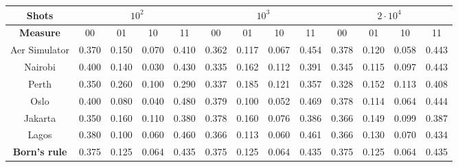\begin{landscape}
\vspace*{\fill}
\begin{tabular}{c|cccc|cccc|cccc}
\toprule
\textbf{Shots}  & \multicolumn{4}{c|}{$10^2$} 
                & \multicolumn{4}{c|}{$10^3$} 
                & \multicolumn{4}{c}{$2\cdot 10^4$}\\
\midrule
\textbf{Measure}  & 00 & 01 & 10 & 11
    & 00 & 01 & 10 & 11
    & 00 & 01 & 10 & 11\\
\midrule
Aer Simulator   & 0.370 & 0.150 & 0.070 & 0.410 
                & 0.362 & 0.117 & 0.067 & 0.454 
                & 0.378 & 0.120 & 0.058 & 0.443\\                
Nairobi         & 0.400 & 0.140 & 0.030 & 0.430 
                & 0.335 & 0.162 & 0.112 & 0.391 
                & 0.345 & 0.115 & 0.097 & 0.443\\               
Perth           & 0.350 & 0.260 & 0.100 & 0.290 
                & 0.337 & 0.185 & 0.121 & 0.357 
                & 0.328 & 0.152 & 0.113 & 0.408\\
Oslo            & 0.400 & 0.080 & 0.040 & 0.480 
                & 0.379 & 0.100 & 0.052 & 0.469 
                & 0.378 & 0.114 & 0.064 & 0.444\\
Jakarta         & 0.350 & 0.160 & 0.110 & 0.380 
                & 0.378 & 0.160 & 0.076 & 0.386 
                & 0.366 & 0.149 & 0.099 & 0.387\\   
Lagos           & 0.380 & 0.100 & 0.060 & 0.460 
                & 0.366 & 0.113 & 0.060 & 0.461 
                & 0.366 & 0.130 & 0.070 & 0.434\\
\midrule
\textbf{Born's rule}     & 0.375 & 0.125 & 0.064 & 0.435 
                & 0.375 & 0.125 & 0.064 & 0.435
                & 0.375 & 0.125 & 0.064 & 0.435\\
\bottomrule        
\end{tabular}
\label{table:quantum_results}
\vspace*{\fill}
\end{landscape}

